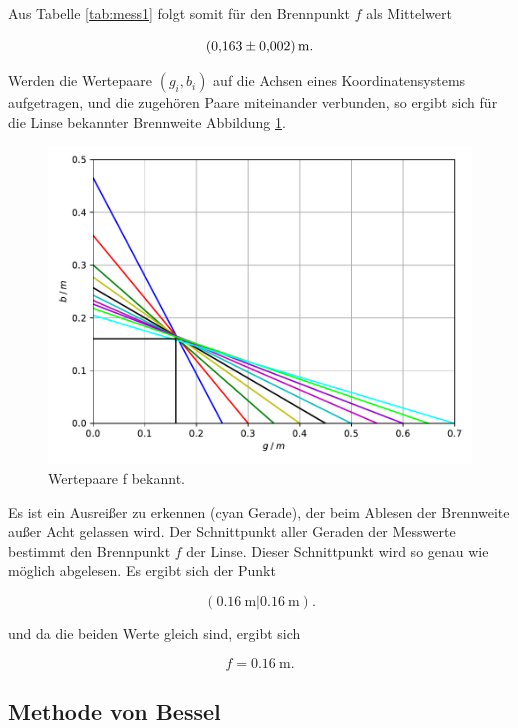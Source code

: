 Aus Tabelle \ref{tab:mess1} folgt somit für den Brennpunkt $f$ als Mittelwert 

\begin{equation*}
\SI{0.163+-0.002}{\meter}.
\end{equation*}

Werden die Wertepaare $(g_i, b_i)$ auf die Achsen eines Koordinatensystems aufgetragen, und 
die zugehören Paare miteinander verbunden, so ergibt sich für die Linse bekannter 
Brennweite Abbildung \ref{fig:plot1}.

\begin{figure}
  \centering
  \includegraphics{content/plot1.pdf}
  \caption{Wertepaare f bekannt.}
  \label{fig:plot1}
\end{figure}

Es ist ein Ausreißer zu erkennen (cyan Gerade), der beim Ablesen der Brennweite außer Acht gelassen wird. 
Der Schnittpunkt aller Geraden der Messwerte bestimmt den Brennpunkt $f$ der Linse. Dieser
Schnittpunkt wird so genau wie möglich abgelesen. Es ergibt sich der Punkt 

\begin{equation*}
(\SI{0.16}{\meter} \vert \SI{0.16}{\meter}).
\end{equation*}

und da die beiden Werte gleich sind, ergibt sich 

\begin{equation*}
f = \SI{0.16}{\meter}.
\end{equation*}

\subsection{Methode von Bessel}

